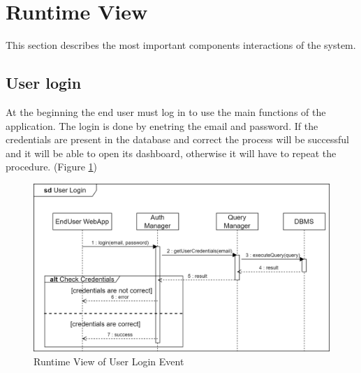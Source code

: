 \newpage
\section{Runtime View}
This section describes the most important components interactions of the system.

\subsection{User login}
At the beginning the end user must log in to use the main functions of the application. The login is done by enetring the email and password. If the credentials are present in the database and correct the process will be successful and it will be able to open its dashboard, otherwise it will have to repeat the procedure. (Figure \ref{fig:RuntimeView_UserLogin})
\begin{figure}[H]
    \centering
    \includegraphics[width=\textwidth]{images/runtimeviews/RuntimeView_UserLogin.png}
    \caption{Runtime View of User Login Event}
    \label{fig:RuntimeView_UserLogin}
\end{figure}

\newpage

